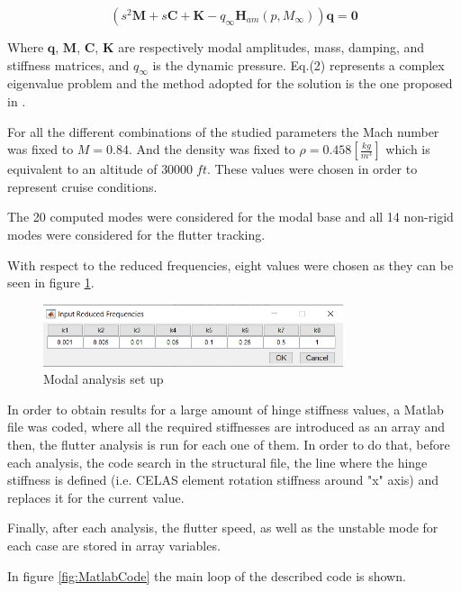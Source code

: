 \documentclass[conference]{IEEEtran}
\newlength\figureheight
\newlength\figurewidth
\begin{document}
\begin{equation}
    (s^2 \textbf{M} + s \textbf{C} + \textbf{K} - q_{\infty} \textbf{H}_{am}(p,M_\infty))\textbf{q}=\textbf{0}
\end{equation}

Where $\textbf{q}$, $\textbf{M}$, $\textbf{C}$, $\textbf{K}$ are respectively modal amplitudes, mass, damping, and stiffness matrices, and $q_\infty$ is the dynamic pressure. Eq.(2) represents a complex eigenvalue problem and the method adopted for the solution is the one proposed in \cite{cardani1978continuation}.

For all the different combinations of the studied parameters the Mach number was fixed to $M = 0.84$. And the density was fixed to $\rho = 0.458 [\frac{kg}{m^3}]$ which is equivalent to an altitude of $30000\;ft$. These values were chosen in order to represent cruise conditions.

The 20 computed modes were considered for the modal base and all 14 non-rigid modes were considered for the flutter tracking.

With respect to the reduced frequencies, eight values were chosen as they can be seen in figure \ref{fig:redFreq}.

\begin{figure}[htp]
  \centering
  \setlength\figureheight{5cm}
  \setlength\figurewidth{6cm}
  \includegraphics[width=250pt]{images/ReducedFreqGUI.png}
  \caption{Modal analysis set up}
  \label{fig:redFreq}
\end{figure}

In order to obtain results for a large amount of hinge stiffness values, a Matlab file was coded, where all the required stiffnesses are introduced as an array and then, the flutter analysis is run for each one of them. In order to do that, before each analysis, the code search in the structural file, the line where the hinge stiffness is defined (i.e. CELAS element rotation stiffness around "x" axis) and replaces it for the current value.

Finally, after each analysis, the flutter speed, as well as the unstable mode for each case are stored in array variables.

In figure \ref{fig:MatlabCode} the main loop of the described code is shown.
\end{document}
